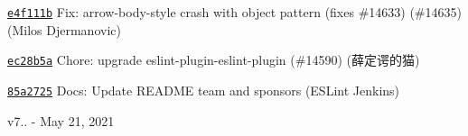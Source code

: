 \begin{DoxyItemize}
\item \href{https://github.com/eslint/eslint/commit/e4f111b67d114adbf76a9c9dbb18fa4f49bc91b6}{\texttt{ {\ttfamily e4f111b}}} Fix\+: arrow-\/body-\/style crash with object pattern (fixes \#14633) (\#14635) (Milos Djermanovic)
\item \href{https://github.com/eslint/eslint/commit/ec28b5a2bdc69f34ce29d670f5e84d2446774a00}{\texttt{ {\ttfamily ec28b5a}}} Chore\+: upgrade eslint-\/plugin-\/eslint-\/plugin (\#14590) (薛定谔的猫)
\item \href{https://github.com/eslint/eslint/commit/85a2725b1fade5538e727102d9701ccb503e54d4}{\texttt{ {\ttfamily 85a2725}}} Docs\+: Update README team and sponsors (ESLint Jenkins)
\end{DoxyItemize}

v7.. -\/ May 21, 2021



